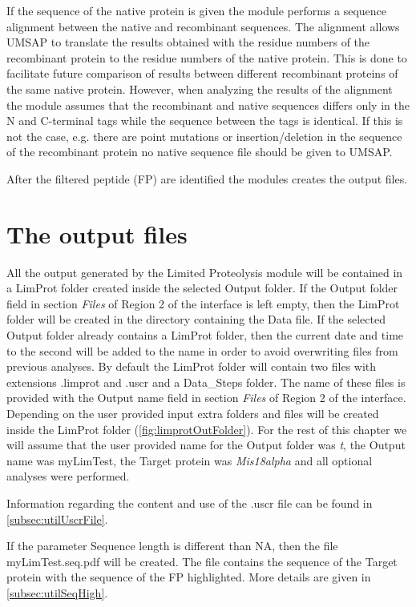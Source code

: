 If the sequence of the native protein is given the module performs a sequence alignment between the native and recombinant sequences. The alignment allows UMSAP to translate the results obtained with the residue numbers of the recombinant protein to the residue numbers of the native protein. This is done to facilitate future comparison of results between different recombinant proteins of the same native protein. However, when analyzing the results of the alignment the module assumes that the recombinant and native sequences differs only in the N and C-terminal tags while the sequence between the tags is identical. If this is not the case, e.g. there are point mutations or insertion/deletion in the sequence of the recombinant protein no native sequence file should be given to UMSAP.

After the filtered peptide (FP) are identified the modules creates the output files.

\section{The output files}

All the output generated by the Limited Proteolysis module will be contained in a LimProt folder created inside the selected Output folder. If the Output folder field in section \textit{Files} of Region \num{2} of the interface is left empty, then the LimProt folder will be created in the directory containing the Data file. If the selected Output folder already contains a LimProt folder, then the current date and time to the second will be added to the name in order to avoid overwriting files from previous analyses. By default the LimProt folder will contain two files with extensions .limprot and .uscr and a Data{\_}Steps folder. The name of these files is provided with the Output name field in section \textit{Files} of Region \num{2} of the interface. Depending on the user provided input extra folders and files will be created inside the LimProt folder (\autoref{fig:limprotOutFolder}). For the rest of this chapter we will assume that the user provided name for the Output folder was \textit{t}, the Output name was myLimTest, the Target protein was \textit{Mis18alpha} and all optional analyses were performed.

Information regarding the content and use of the .uscr file can be found in \autoref{subsec:utilUscrFile}.

If the parameter Sequence length is different than NA, then the file myLimTest.seq.pdf will be created. The file contains the sequence of the Target protein with the sequence of the FP highlighted. More details are given in \autoref{subsec:utilSeqHigh}.

